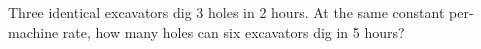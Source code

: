 Three identical excavators dig 3 holes in 2 hours. At the same constant per-machine rate, how many holes can six excavators dig in 5 hours?
